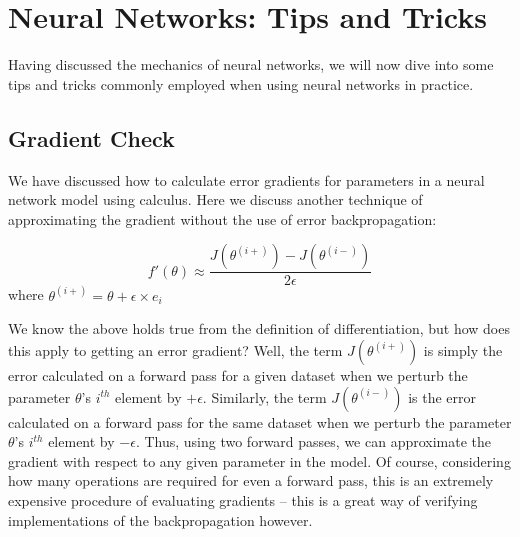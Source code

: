 \documentclass{tufte-handout}
\begin{document}
\section{Neural Networks: Tips and Tricks}\label{sec:nnetstips}

Having discussed the mechanics of neural networks, we will now dive into some tips and tricks commonly employed when using neural networks in practice.

\subsection{Gradient Check}
We have discussed how to calculate error gradients for parameters in a neural network model using calculus. Here we discuss another technique of approximating the gradient without the use of error backpropagation:

$$ f'(\theta) \approx \frac{J(\theta^{(i+)}) - J(\theta^{(i-)})}{2 \epsilon} $$
where $\theta^{(i+)} = \theta + \epsilon \times e_i$

We know the above holds true from the definition of differentiation, but how does this apply to getting an error gradient? Well, the term $J(\theta^{(i+)})$ is simply the error calculated on a forward pass for a given dataset when we perturb the parameter $\theta$'s $i^{th}$ element by $+\epsilon$. Similarly, the term $J(\theta^{(i-)})$ is the error calculated on a forward pass for the same dataset when we perturb the parameter $\theta$'s $i^{th}$ element by $-\epsilon$. Thus, using two forward passes, we can approximate the gradient with respect to any given parameter in the model. Of course, considering how many operations are required for even a forward pass, this is an extremely expensive procedure of evaluating gradients -- this is a great way of verifying implementations of the backpropagation however.

\end{document}
